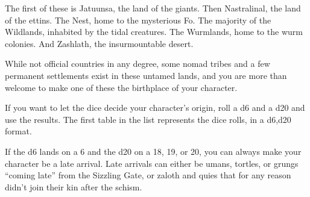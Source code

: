 The first of these is Jatuunsa, the land of the giants.
Then Nastralinal, the land of the ettins.
The Nest, home to the mysterious Fo.
The majority of the Wildlands, inhabited by the tidal creatures.
The Wurmlands, home to the wurm colonies.
And Zashlath, the insurmountable desert.

While not official countries in any degree, some nomad tribes and a few permanent settlements exist in these untamed lands, and you are more than welcome to make one of these the birthplace of your character.

If you want to let the dice decide your character's origin, roll a d6 and a d20 and use the results.
The first table in the list represents the dice rolls, in a d6,d20 format.

If the d6 lands on a 6 and the d20 on a 18, 19, or 20, you can always make your character be a late arrival.
Late arrivals can either be umans, tortles, or grungs ``coming late'' from the Sizzling Gate, or zaloth and quies that for any reason didn't join their kin after the schism.

\newpage


